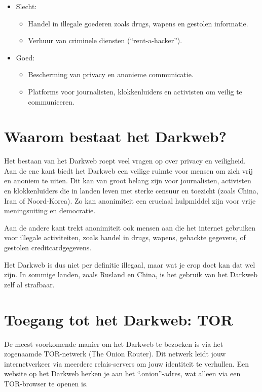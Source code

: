 \documentclass[
  10pt,
  dutch,
  paper=a4,
  ,captions=tableheading
]{scrbook}
\providecommand{\tightlist}{%
  \setlength{\itemsep}{0pt}\setlength{\parskip}{0pt}}
\begin{document}
\begin{itemize}
\tightlist
\item
  Slecht:

  \begin{itemize}
  \tightlist
  \item
    Handel in illegale goederen zoals drugs, wapens en gestolen
    informatie.
  \item
    Verhuur van criminele diensten (``rent-a-hacker'').
  \end{itemize}
\item
  Goed:

  \begin{itemize}
  \tightlist
  \item
    Bescherming van privacy en anonieme communicatie.
  \item
    Platforms voor journalisten, klokkenluiders en activisten om veilig
    te communiceren.
  \end{itemize}
\end{itemize}

\section{Waarom bestaat het Darkweb?}\label{waarom-bestaat-het-darkweb}

Het bestaan van het Darkweb roept veel vragen op over privacy en
veiligheid. Aan de ene kant biedt het Darkweb een veilige ruimte voor
mensen om zich vrij en anoniem te uiten. Dit kan van groot belang zijn
voor journalisten, activisten en klokkenluiders die in landen leven met
sterke censuur en toezicht (zoals China, Iran of Noord-Korea). Zo kan
anonimiteit een cruciaal hulpmiddel zijn voor vrije meningsuiting en
democratie.

Aan de andere kant trekt anonimiteit ook mensen aan die het internet
gebruiken voor illegale activiteiten, zoals handel in drugs, wapens,
gehackte gegevens, of gestolen creditcardgegevens.

Het Darkweb is dus niet per definitie illegaal, maar wat je erop doet
kan dat wel zijn. In sommige landen, zoals Rusland en China, is het
gebruik van het Darkweb zelf al strafbaar.

\section{Toegang tot het Darkweb:
TOR}\label{toegang-tot-het-darkweb-tor}

De meest voorkomende manier om het Darkweb te bezoeken is via het
zogenaamde TOR-netwerk (The Onion Router). Dit netwerk leidt jouw
internetverkeer via meerdere relais-servers om jouw identiteit te
verhullen. Een website op het Darkweb herken je aan het
``.onion''-adres, wat alleen via een TOR-browser te openen is.
\end{document}
